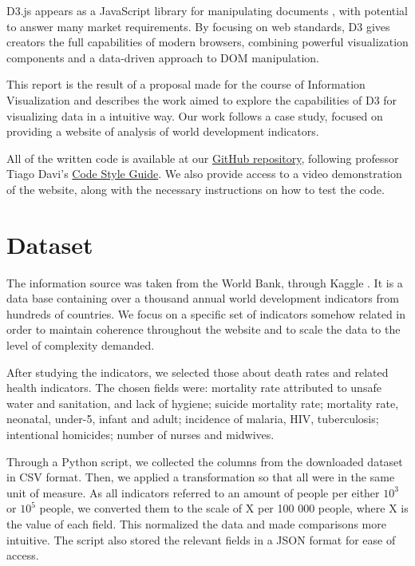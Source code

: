\documentclass[conference]{IEEEtran}
\begin{document}
D3.js appears as a JavaScript library for manipulating documents \cite{d3}, with 
potential to answer many market requirements.
By focusing on web standards, D3 gives creators the full capabilities of modern 
browsers, combining powerful visualization components and a data-driven approach 
to DOM manipulation. 

This report is the result of a proposal made for the course of Information
Visualization \cite{proj} and describes the work aimed to explore the 
capabilities of D3 for visualizing data in a intuitive way.
Our work follows a case study, focused on providing a website of 
analysis of world development indicators.

All of the written code is available at our  
\href{https://github.com/joao-alegria/VI}{GitHub repository}, following professor Tiago Davi's
\href{https://github.com/tiagodavi70/ua_infovis/blob/c50422815f49b0a4747c6f727042b4da95dd7af2/D3/Code_Style.md}{Code Style Guide}.
We also provide access to a video demonstration of the website, along with 
the necessary instructions on how to test the code.

\section{Dataset}

The information source was taken from the World Bank, through Kaggle \cite{kaggle}.
It is a data base containing over a thousand annual world development indicators
from hundreds of countries.
We focus on a specific set of indicators somehow related in order to maintain 
coherence throughout the website and to scale the data to the level of complexity 
demanded.

After studying the indicators, we selected those about death rates and related 
health indicators.
The chosen fields were: mortality rate attributed to unsafe water and sanitation,
and lack of hygiene; suicide mortality rate; mortality rate, neonatal, under-5, 
infant and adult; incidence of malaria, HIV, tuberculosis; intentional 
homicides; number of nurses and midwives.

Through a Python script, we collected the columns from the downloaded dataset in 
CSV format.
Then, we applied a transformation so that all were in the same unit of measure.
As all indicators referred to an amount of people per either $10^3$ or $10^5$ 
people, we converted them to the scale of X per 100 000 people, where X is the 
value of each field. This normalized the data and made comparisons more intuitive.
The script also stored the relevant fields in a JSON format for ease of access.
\end{document}
